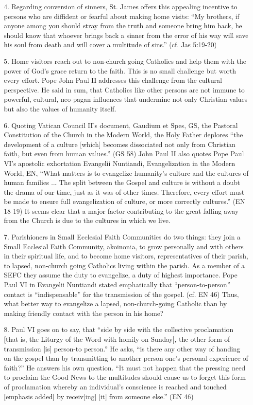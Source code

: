 \documentclass[oneside]{book}
\begin{document}
4. Regarding conversion of sinners, St. James offers this appealing incentive to
persons who are diffident or fearful about making home visits: ``My brothers, if
anyone among you should stray from the truth and someone bring him back, he
should know that whoever brings back a sinner from the error of his way will
save his soul from death and will cover a multitude of sins.'' (cf. Jas 5:19-20)

5. Home visitors reach out to non-church going Catholics and help them with the
power of God's grace return to the faith. This is no small challenge but worth
every effort. Pope John Paul II addresses this challenge from the cultural
perspective. He said in sum, that Catholics like other persons are not immune to
powerful, cultural, neo-pagan influences that undermine not only Christian
values but also the values of humanity itself.

6. Quoting Vatican Council II's document, Gaudium et Spes, GS, the Pastoral
Constitution of the Church in the Modern World, the Holy Father deplores ``the
development of a culture [which] becomes dissociated not only from Christian
faith, but even from human values.'' (GS 58) John Paul II also quotes Pope Paul
VI's apostolic exhortation Evangelii Nuntiandi, Evangelization in the Modern
World, EN, ``What matters is to evangelize humanity's culture and the cultures
of human families ... The split between the Gospel and culture is without a
doubt the drama of our time, just as it was of other times. Therefore, every
effort must be made to ensure full evangelization of culture, or more correctly
cultures.'' (EN 18-19) It seems clear that a major factor contributing to the
great falling away from the Church is due to the cultures in which we live.

7. Parishioners in Small Ecclesial Faith Communities do two things: they join a
Small Ecclesial Faith Community, akoinonia, to grow personally and with others
in their spiritual life, and to become home visitors, representatives of their
parish, to lapsed, non-church going Catholics living within the parish. As a
member of a SEFC they assume the duty to evangelize, a duty of highest
importance. Pope Paul VI in Evangelii Nuntiandi stated emphatically that
``person-to-person'' contact is ``indispensable'' for the transmission of the
gospel. (cf. EN 46) Thus, what better way to evangelize a lapsed,
non-church-going Catholic than by making friendly contact with the person in his
home?

8. Paul VI goes on to say, that ``side by side with the collective proclamation
[that is, the Liturgy of the Word with homily on Sunday], the other form of
transmission [is] person-to person.'' He asks, ``is there any other way of
handing on the gospel than by transmitting to another person one's personal
experience of faith?'' He answers his own question. ``It must not happen that
the pressing need to proclaim the Good News to the multitudes should cause us to
forget this form of proclamation whereby an individual's conscience is reached
and touched [emphasis added] by receiv[ing] [it] from someone else.'' (EN 46)
\end{document}
